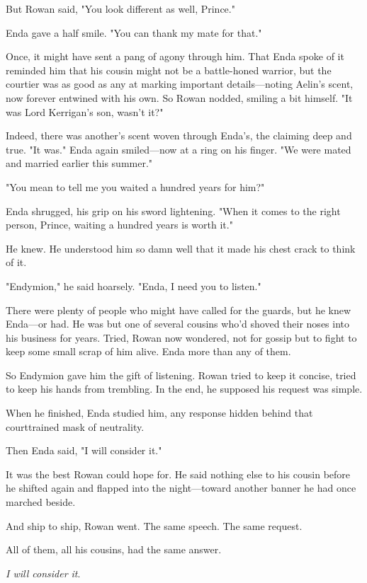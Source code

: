 But Rowan said, "You look different as well, Prince."

Enda gave a half smile. "You can thank my mate for that."

Once, it might have sent a pang of agony through him. That Enda spoke of it reminded him that his cousin might not be a battle-honed warrior, but the courtier was as good as any at marking important details---noting Aelin's scent, now forever entwined with his own. So Rowan nodded, smiling a bit himself. "It was Lord Kerrigan's son, wasn't it?"

Indeed, there was another's scent woven through Enda's, the claiming deep and true. "It was." Enda again smiled---now at a ring on his finger. "We were mated and married earlier this summer."

"You mean to tell me you waited a hundred years for him?"

Enda shrugged, his grip on his sword lightening. "When it comes to the right person, Prince, waiting a hundred years is worth it."

He knew. He understood him so damn well that it made his chest crack to think of it.

"Endymion," he said hoarsely. "Enda, I need you to listen."

There were plenty of people who might have called for the guards, but he knew Enda---or had. He was but one of several cousins who'd shoved their noses into his business for years. Tried, Rowan now wondered, not for gossip but  to fight to keep some small scrap of him alive. Enda more than any of them.

So Endymion gave him the gift of listening. Rowan tried to keep it concise, tried to keep his hands from trembling. In the end, he supposed his request was simple.

When he finished, Enda studied him, any response hidden behind that courttrained mask of neutrality.

Then Enda said, "I will consider it."

It was the best Rowan could hope for. He said nothing else to his cousin before he shifted again and flapped into the night---toward another banner he had once marched beside.

And ship to ship, Rowan went. The same speech. The same request.

All of them, all his cousins, had the same answer.

\emph{I will consider it}.
